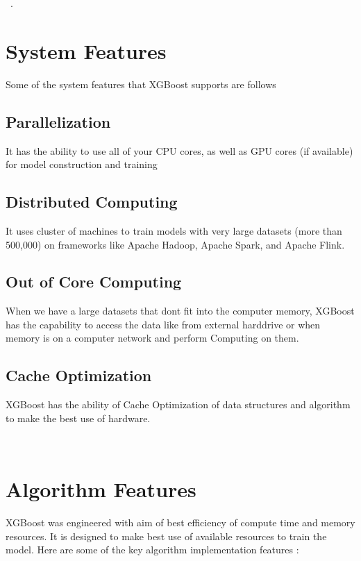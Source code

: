 ~\cite{hid-sp18-401-XGBoost-MLmastery}.


\section{System Features}

Some of the system features that XGBoost supports are follows 

\subsection{Parallelization}

It has the ability to use all of your CPU cores, as well as GPU cores (if
available) for model construction and training

\subsection{Distributed Computing}

It uses cluster of machines to train models with very large datasets (more than
500,000) on frameworks like Apache Hadoop, Apache Spark, and Apache Flink.

\subsection{Out of Core Computing}

When we have a large datasets that dont fit into the computer memory, XGBoost
has the capability to access the data  like from external harddrive or when
memory is on a computer network and perform Computing on them.

\subsection{Cache Optimization}  XGBoost has the ability of Cache Optimization
of data structures and algorithm to make the best use of hardware.

~\cite{hid-sp18-401-XGBoost-MLmastery}

\section{Algorithm Features} 

XGBoost was engineered with aim of best efficiency of compute time and memory
resources. It is designed to make best use of available resources to train the
model. Here are some of the key algorithm implementation features :

